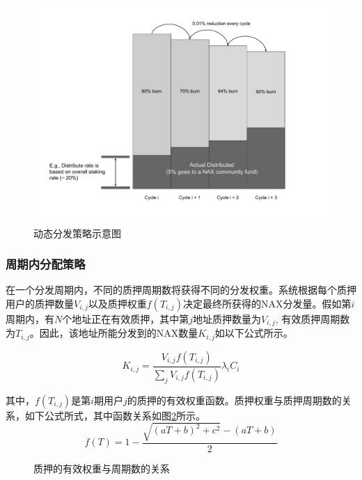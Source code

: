 \begin{figure}[htbp]
  \centering
    \includegraphics[width=1\textwidth]{../common/dynamic_dist.pdf}
    \caption{动态分发策略示意图 \label{fig:dynamic_dist}}
\end{figure}

\subsubsection{周期内分配策略}
在一个分发周期内，不同的质押周期数将获得不同的分发权重。系统根据每个质押用户的质押数量$V_{i,j}$以及质押权重\(f(T_{i,j})\)决定最终所获得的NAX分发量。假如第$i$周期内，有$N$个地址正在有效质押，其中第$j$地址质押数量为$V_{i,j}$, 有效质押周期数为$T_{i,j}$。因此，该地址所能分发到的NAX数量$K_{i,j}$如以下公式所示。

\begin{equation}
  K_{i,j} = \frac{V_{i,j} f(T_{i,j})}{\sum_j V_{i,j} f(T_{i,j})} \lambda_i C_i
\end{equation}

其中，\(f(T_{i,j})\)是第\(i\)期用户\(j\)的质押的有效权重函数。质押权重与质押周期数的关系，如下公式所式，其中函数关系如图\ref{weight}所示。
\begin{equation}
  f(T) = 1 - \frac{\sqrt{(aT+b)^2+c^2}-(aT+b)}{2}
\end{equation}

\begin{figure}[h]
\begin{center}
\caption{质押的有效权重与周期数的关系}\label{weight}
\end{center}
\end{figure}

